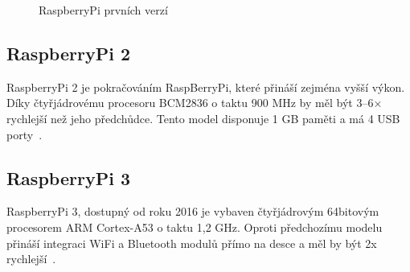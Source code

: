 \begin{figure}[!ht]
    \centering
			\hspace*{5mm}
			\hspace*{5mm}
		\caption{RaspberryPi prvních verzí}
\end{figure}
	
	\subsection{RaspberryPi 2}
	RaspberryPi 2 je pokračováním RaspBerryPi, které přináší zejména vyšší výkon. Díky čtyřjádrovému procesoru BCM2836 o taktu 900 MHz by měl být 3–6× rychlejší než jeho předchůdce. Tento model disponuje 1 GB paměti a má 4 USB porty~\cite{RaspiTwo}.


\subsection{RaspberryPi 3}
		RaspberryPi 3, dostupný od roku 2016 je vybaven čtyřjádrovým 64bitovým procesorem ARM Cortex-A53 o taktu 1,2 GHz. Oproti předchozímu modelu přináší integraci WiFi a Bluetooth modulů přímo na desce a měl by být 2x rychlejší~\cite{RaspiThree}.
		

